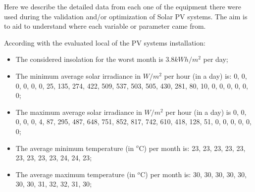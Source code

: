 Here we describe the detailed data from each one of the equipment there were used during the validation and/or optimization of Solar PV systems. The aim is to aid to understand where each variable or parameter came from.

According with the evaluated local of the PV systems installation:
\begin{itemize}
 \item The considered insolation for the worst month is $3.8 kWh/m^{2}$ per day;
 \item The minimum average solar irradiance in $W/m^{2}$ per hour (in a day) is:  {0, 0, 0, 0, 0, 0, 25, 135, 274, 422, 509, 537, 503, 505, 430, 281, 80, 10, 0, 0, 0, 0, 0, 0};
 \item The maximum average solar irradiance in $W/m^{2}$ per hour (in a day) is {0, 0, 0, 0, 0, 4, 87, 295, 487, 648, 751, 852, 817, 742, 610, 418, 128, 51, 0, 0, 0, 0, 0, 0};
 \item The average minimum temperature (in $^{o}$C) per month is: {23, 23, 23, 23, 23, 23, 23, 23, 23, 24, 24, 23};
 \item The average maximum temperature (in $^{o}$C) per month is: {30, 30, 30, 30, 30, 30, 30, 31, 32, 32, 31, 30};
\end{itemize} 

